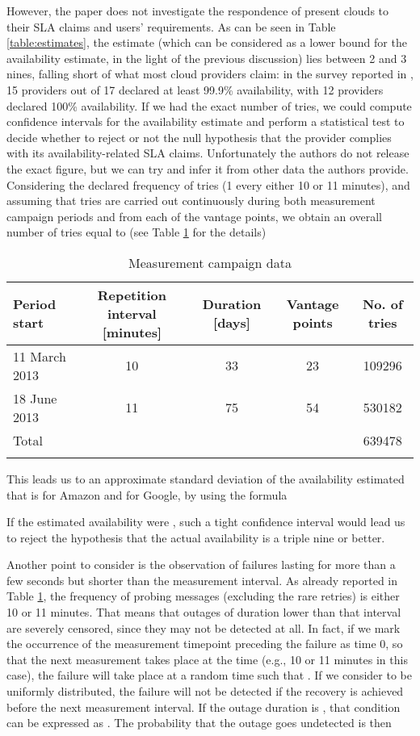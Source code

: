 \documentclass[runningheads,a4paper]{llncs}
\begin{document}
However, the paper does not investigate the respondence of present clouds to their SLA claims and users' requirements. As can be seen in Table \ref{table:estimates}, the estimate  (which can be considered as a lower bound for the availability estimate, in the light of the previous discussion) lies between 2 and 3 nines, falling short of what most cloud providers claim: in the survey reported in \cite{CasalicchioS13}, 15 providers out of 17 declared at least 99.9\% availability, with 12 providers declared 100\% availability. If we had the exact number of tries, we could compute confidence intervals for the availability estimate and perform a statistical test to decide whether to reject or not the null hypothesis that the provider complies with its availability-related SLA claims. Unfortunately the authors do not release the exact figure, but we can try and infer it from other data the authors provide. Considering the declared frequency of tries (1 every either 10 or 11 minutes), and assuming that tries are carried out continuously during both measurement campaign periods and from each of the vantage points, we obtain an overall number of tries equal to  (see Table \ref{table:datmis} for the details)
\begin{table}
\begin{tabular}{lcccc}
\toprule
Period start & Repetition interval [minutes] & Duration [days] & Vantage points & No. of tries\\
\midrule
11 March 2013 & 10 & 33 & 23 & 109296\\
18 June 2013 & 11 & 75 & 54 & 530182\\
\midrule
Total & & & & 639478\\
\bottomrule\\
\end{tabular}
\caption{Measurement campaign data}
\label{table:datmis}
\end{table}
This leads us to an approximate standard deviation  of the availability estimated that is  for Amazon and  for Google, by using the formula 

If the estimated availability were , such a tight confidence interval would lead us to reject the hypothesis that the actual availability is a triple nine or better.
 
Another point to consider is the observation of failures lasting for more than a few seconds but shorter than the measurement interval. As already reported in Table \ref{table:datmis}, the frequency of probing messages (excluding the rare retries) is either 10 or 11 minutes. That means that outages of duration lower than that interval are severely censored, since they may not be detected at all. In fact, if we mark the occurrence of the measurement timepoint preceding the failure as time 0, so that the next measurement takes place at the time  (e.g., 10 or 11 minutes in this case), the failure will take place at a random time  such that . If we consider  to be uniformly distributed, the failure will not be detected if the recovery is achieved before the next measurement interval. If the outage duration is , that condition can be expressed as . The probability that the outage goes undetected is then
\end{document}
